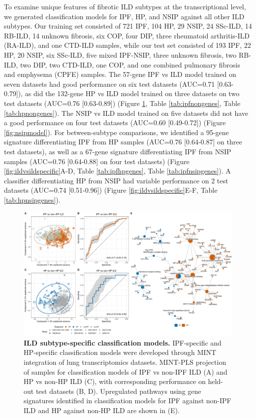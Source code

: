 \documentclass[
]{article}
\begin{document}
To examine unique features of fibrotic ILD subtypes at the transcriptional level, we generated classification models for IPF, HP, and NSIP against all other ILD subtypes. Our training set consisted of 721 IPF, 104 HP, 29 NSIP, 24 SSc-ILD, 14 RB-ILD, 14 unknown fibrosis, six COP, four DIP, three rheumatoid arthritis-ILD (RA-ILD), and one CTD-ILD samples, while our test set consisted of 193 IPF, 22 HP, 20 NSIP, six SSc-ILD, five mixed IPF-NSIP, three unknown fibrosis, two RB-ILD, two DIP, two CTD-ILD, one COP, and one combined pulmonary fibrosis and emphysema (CPFE) samples. The 57-gene IPF vs ILD model trained on seven datasets had good performance on six test datasets (AUC=0.71 {[}0.63-0.79{]}), as did the 132-gene HP vs ILD model trained on three datasets on two test datasets (AUC=0.76 {[}0.63-0.89{]}) (Figure \ref{fig:ILDvILD}, Table \ref{tab:ipfnongenes}, Table \ref{tab:hpnongenes}). The NSIP vs ILD model trained on five datasets did not have a good performance on four test datasets (AUC=0.60 {[}0.49-0.72{]}) (Figure \ref{fig:nsipmodel}). For between-subtype comparisons, we identified a 95-gene signature differentiating IPF from HP samples (AUC=0.76 {[}0.64-0.87{]} on three test datasets), as well as a 67-gene signature differentiating IPF from NSIP samples (AUC=0.76 {[}0.64-0.88{]} on four test datasets) (Figure \ref{fig:ildvsildspecific}A-D, Table \ref{tab:ipfhpgenes}, Table \ref{tab:ipfnsipgenes}). A classifier differentiating HP from NSIP had variable performance on 2 test datasets (AUC=0.74 {[}0.51-0.96{]}) (Figure \ref{fig:ildvsildspecific}E-F, Table \ref{tab:hpnsipgenes}).



\begin{figure}

{\centering \includegraphics[width=0.95\linewidth,]{./Figures/SysReview/Figure4_ILDvsILD} 

}

\caption[ILD vs ILD]{\textbf{ILD subtype-specific classification models.} IPF-specific and HP-specific classification models were developed through MINT integration of lung transcriptomics datasets. MINT-PLS projection of samples for classification models of IPF vs non-IPF ILD (A) and HP vs non-HP ILD (C), with corresponding performance on held-out test datasets (B, D). Upregulated pathways using gene signatures identified in classification models for IPF against non-IPF ILD and HP against non-HP ILD are shown in (E).}\label{fig:ILDvILD}
\end{figure}
\end{document}
